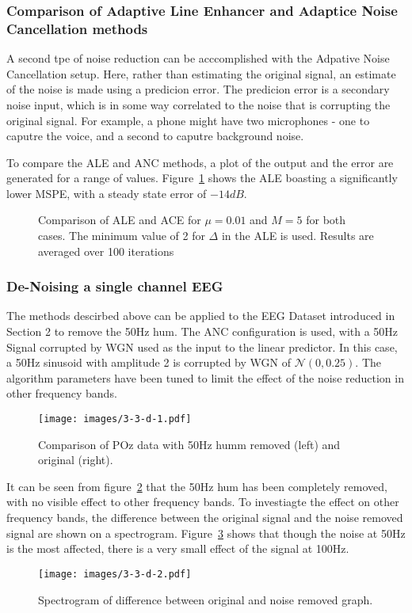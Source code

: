 \documentclass[main.tex]{subfiles}
\begin{document}
\subsubsection{Comparison of Adaptive Line Enhancer and Adaptice Noise Cancellation methods}

A second tpe of noise reduction can be acccomplished with the Adpative Noise Cancellation setup. Here, rather than estimating the original signal, an estimate of the noise is made using a predicion error. The predicion error is a secondary noise input, which is in some way correlated to the noise that is corrupting the original signal. For example, a phone might have two microphones - one to caputre the voice, and a second to caputre background noise.

To compare the ALE and ANC methods, a plot of the output and the error are generated for a range of values. Figure~\ref{fig:q3_3_c} shows the ALE boasting a significantly lower MSPE, with a steady state error of $-14dB$.

\begin{figure}[H]
	\centering 
	\resizebox{0.7\textwidth}{!}{}
	\caption{Comparison of ALE and ACE for $\mu = 0.01$ and $M = 5$ for both cases. The minimum value of 2 for $\Delta$ in the ALE is used. Results are averaged over 100 iterations}
	\label{fig:q3_3_c}
\end{figure}


\subsubsection{De-Noising a single channel EEG}

The methods descirbed above can be applied to the EEG Dataset introduced in Section 2 to remove the 50Hz hum. The ANC configuration is used, with a 50Hz Signal corrupted by WGN used as the input to the linear predictor. In this case, a 50Hz sinusoid with amplitude 2 is corrupted by WGN of $\mathcal{N}(0,0.25)$. The algorithm parameters have been tuned to limit the effect of the noise reduction in other frequency bands.

\begin{figure}[H]
	\centering
	\texttt{[image: images/3-3-d-1.pdf]}
	\caption{Comparison of POz data with 50Hz humm removed (left) and original (right).}
	\label{fig:3-3-d-1}
\end{figure}

It can be seen from figure~\ref{fig:3-3-d-1} that the 50Hz hum has been completely removed, with no visible effect to other frequency bands. To investiagte the effect on other frequency bands, the difference between the original signal and the noise removed signal are shown on a spectrogram. Figure~\ref{fig:3-3-d-2} shows that though the noise at 50Hz is the most affected, there is a very small effect of the signal at 100Hz.

\begin{figure}[H]
	\centering
	\texttt{[image: images/3-3-d-2.pdf]}
	\caption{Spectrogram of difference between original and noise removed graph.}
	\label{fig:3-3-d-2}
\end{figure}



\end{document}
